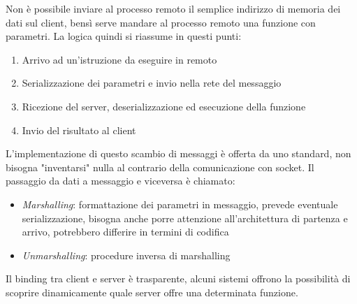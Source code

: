 Non è possibile inviare al processo remoto il semplice indirizzo di memoria dei 
dati sul client, bensì serve mandare al processo remoto una funzione con parametri.
La logica quindi si riassume in questi punti:
\begin{enumerate}
    \item Arrivo ad un'istruzione da eseguire in remoto
    \item Serializzazione dei parametri e invio nella rete del messaggio
    \item Ricezione del server, deserializzazione ed esecuzione della funzione
    \item Invio del risultato al client
\end{enumerate}
L'implementazione di questo scambio di messaggi è offerta da uno standard, 
non bisogna "inventarsi" nulla al contrario della comunicazione con socket.
Il passaggio da dati a messaggio e viceversa è chiamato:
\begin{itemize}
    \item \emph{Marshalling}: formattazione dei parametri in messaggio, prevede
    eventuale serializzazione, bisogna anche porre attenzione all'architettura
    di partenza e arrivo, potrebbero differire in termini di codifica
    \item \emph{Unmarshalling}: procedure inversa di marshalling
\end{itemize}
Il binding tra client e server è trasparente, alcuni sistemi offrono la possibilità 
di scoprire dinamicamente quale server offre una determinata funzione.

